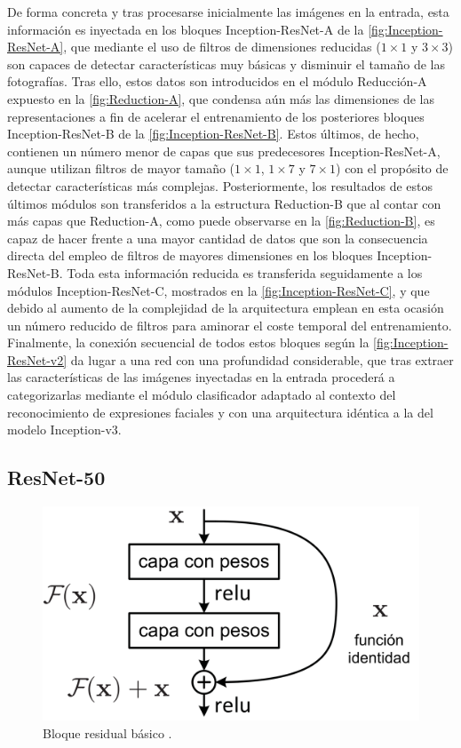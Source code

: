 De forma concreta y tras procesarse inicialmente las imágenes en la entrada, esta información es inyectada en los bloques Inception-ResNet-A de la \autoref{fig:Inception-ResNet-A}, que mediante el uso de filtros de dimensiones reducidas ($1\times 1$ y $3\times 3$) son capaces de detectar características muy básicas y disminuir el tamaño de las fotografías. Tras ello, estos datos son introducidos en el módulo Reducción-A expuesto en la \autoref{fig:Reduction-A}, que condensa aún más las dimensiones de las representaciones a fin de acelerar el entrenamiento de los posteriores bloques Inception-ResNet-B de la \autoref{fig:Inception-ResNet-B}. Estos últimos, de hecho, contienen un número menor de capas que sus predecesores Inception-ResNet-A, aunque utilizan filtros de mayor tamaño ($1\times 1$, $1\times 7$ y $7\times 1$) con el propósito de detectar características más complejas. Posteriormente, los resultados de estos últimos módulos son transferidos a la estructura Reduction-B que al contar con más capas que Reduction-A, como puede observarse en la \autoref{fig:Reduction-B}, es capaz de hacer frente a una mayor cantidad de datos que son la consecuencia directa del empleo de filtros de mayores dimensiones en los bloques Inception-ResNet-B. Toda esta información reducida es transferida seguidamente a los módulos Inception-ResNet-C, mostrados en la \autoref{fig:Inception-ResNet-C}, y que debido al aumento de la complejidad de la arquitectura emplean en esta ocasión un número reducido de filtros para aminorar el coste temporal del entrenamiento. Finalmente, la conexión secuencial de todos estos bloques según la \autoref{fig:Inception-ResNet-v2} da lugar a una red con una profundidad considerable, que tras extraer las características de las imágenes inyectadas en la entrada procederá a categorizarlas mediante el módulo clasificador adaptado al contexto del reconocimiento de expresiones faciales y con una arquitectura idéntica a la del modelo Inception-v3.

\subsection{ResNet-50}

\begin{figure}
    \centering
    \includegraphics[scale=0.2]{Images/ResnetBlock.png}
    \caption{Bloque residual básico \cite{ResNet}.}
    \label{fig:ResNetBlock}
\end{figure}

